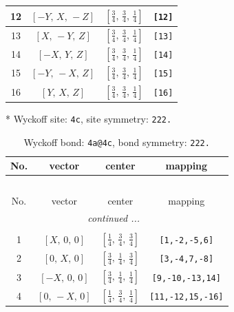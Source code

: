 \documentclass[fleqn,8pt]{jsarticle}
\begin{document}
\begin{longtable}{cccc}
12 & $\left[ - Y,\, X,\, - Z \right]$ & $\left[ \frac{3}{4},\, \frac{3}{4},\, \frac{1}{4} \right]$ & {\tt [12]} \\ \hline
13 & $\left[ X,\, - Y,\, Z \right]$ & $\left[ \frac{3}{4},\, \frac{3}{4},\, \frac{1}{4} \right]$ & {\tt [13]} \\ \hline
14 & $\left[ - X,\, Y,\, Z \right]$ & $\left[ \frac{3}{4},\, \frac{3}{4},\, \frac{1}{4} \right]$ & {\tt [14]} \\ \hline
15 & $\left[ - Y,\, - X,\, Z \right]$ & $\left[ \frac{3}{4},\, \frac{3}{4},\, \frac{1}{4} \right]$ & {\tt [15]} \\ \hline
16 & $\left[ Y,\, X,\, Z \right]$ & $\left[ \frac{3}{4},\, \frac{3}{4},\, \frac{1}{4} \right]$ & {\tt [16]} \\
\end{longtable}
* Wyckoff site: {\tt 4c}, site symmetry: {\tt 222.}
\renewcommand{\arraystretch}{1.2}
\begin{longtable}{cccc}
\caption{Wyckoff bond: {\tt 4a@4c}, bond symmetry: {\tt 222.}}
 \\
 \hline \hline
No. & vector & center & mapping \\ \hline \endfirsthead

\multicolumn{3}{l}{\tablename\ \thetable{}} \\
 \hline \hline
No. & vector & center & mapping \\ \hline \endhead

 \hline \hline
\multicolumn{3}{r}{\footnotesize\it continued ...} \\ \endfoot

 \hline \hline
\multicolumn{3}{r}{} \\ \endlastfoot

1 & $\left[ X,\, 0,\, 0 \right]$ & $\left[ \frac{1}{4},\, \frac{3}{4},\, \frac{3}{4} \right]$ & {\tt [1,-2,-5,6]} \\ \hline
2 & $\left[ 0,\, X,\, 0 \right]$ & $\left[ \frac{3}{4},\, \frac{1}{4},\, \frac{3}{4} \right]$ & {\tt [3,-4,7,-8]} \\ \hline
3 & $\left[ - X,\, 0,\, 0 \right]$ & $\left[ \frac{3}{4},\, \frac{1}{4},\, \frac{1}{4} \right]$ & {\tt [9,-10,-13,14]} \\ \hline
4 & $\left[ 0,\, - X,\, 0 \right]$ & $\left[ \frac{1}{4},\, \frac{3}{4},\, \frac{1}{4} \right]$ & {\tt [11,-12,15,-16]} \\
\end{longtable}
\renewcommand{\arraystretch}{1.2}
\end{document}
